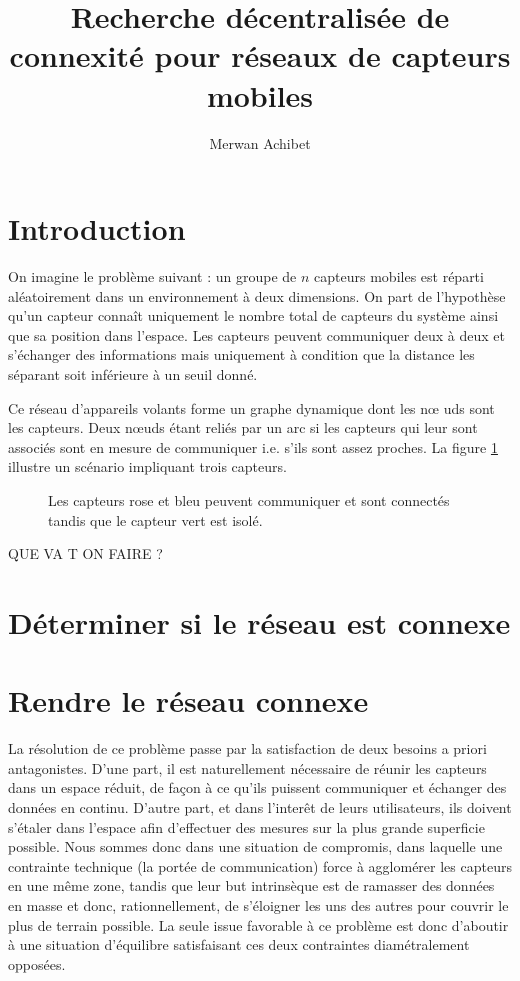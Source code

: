 \documentclass[10pt]{article}
\title{Recherche décentralisée de connexité pour réseaux de capteurs mobiles}
\author{Merwan Achibet}
\date{}
\begin{document}
\maketitle

\begin{multicols}{2}

\section{Introduction}

On imagine le problème suivant : un groupe de $n$ capteurs mobiles est
réparti aléatoirement dans un environnement à deux dimensions. On part
de l'hypothèse qu'un capteur connaît uniquement le nombre total de
capteurs du système ainsi que sa position dans l'espace. Les capteurs
peuvent communiquer deux à deux et s'échanger des informations mais
uniquement à condition que la distance les séparant soit inférieure à
un seuil donné.

Ce réseau d'appareils volants forme un graphe dynamique dont les n\oe
uds sont les capteurs. Deux n\oe uds étant reliés par un arc si les
capteurs qui leur sont associés sont en mesure de communiquer
i.e. s'ils sont assez proches. La figure \ref{communication} illustre
un scénario impliquant trois capteurs.

\begin{figure}[H]

  \centering

  

  \caption{Les capteurs rose et bleu peuvent communiquer et sont
    connectés tandis que le capteur vert est isolé.}
  \label{communication}

\end{figure}

QUE VA T ON FAIRE ?

\section{Déterminer si le réseau est connexe}

\section{Rendre le réseau connexe}

La résolution de ce problème passe par la satisfaction de deux besoins
a priori antagonistes. D'une part, il est naturellement nécessaire de
réunir les capteurs dans un espace réduit, de façon à ce qu'ils
puissent communiquer et échanger des données en continu. D'autre part,
et dans l'interêt de leurs utilisateurs, ils doivent s'étaler dans
l'espace afin d'effectuer des mesures sur la plus grande superficie
possible. Nous sommes donc dans une situation de compromis, dans
laquelle une contrainte technique (la portée de communication) force à
agglomérer les capteurs en une même zone, tandis que leur but
intrinsèque est de ramasser des données en masse et donc,
rationnellement, de s'éloigner les uns des autres pour couvrir le plus
de terrain possible. La seule issue favorable à ce problème est donc
d'aboutir à une situation d'équilibre satisfaisant ces deux
contraintes diamétralement opposées.


\end{multicols}
\end{document}
